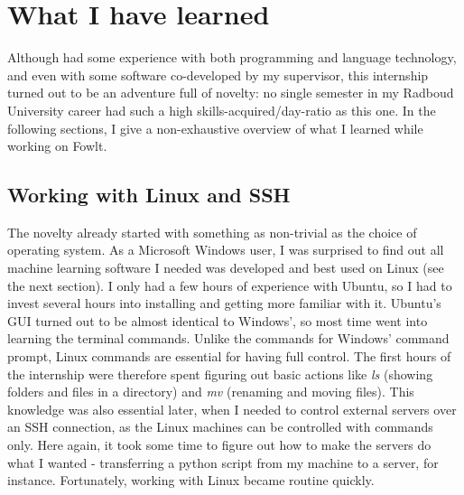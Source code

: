 \documentclass[12pt]{article}
\begin{document}
\section{What I have learned}
Although had some experience with both programming and language technology, and even with some software co-developed by my supervisor, this internship turned out to be an adventure full of novelty: no single semester in my Radboud University career had such a high skills-acquired/day-ratio as this one. In the following sections, I give a non-exhaustive overview of what I learned while working on Fowlt.

\subsection{Working with Linux and SSH}
The novelty already started with something as non-trivial as the choice of operating system. As a Microsoft Windows user, I was surprised to find out all machine learning software I needed was developed and best used on Linux (see the next section). I only had a few hours of experience with Ubuntu, so I had to invest several hours into installing and getting more familiar with it. Ubuntu's GUI turned out to be almost identical to Windows', so most time went into learning the terminal commands. Unlike the commands for Windows' command prompt, Linux commands are essential for having full control. The first hours of the internship were therefore spent figuring out basic actions like \emph{ls} (showing folders and files in a directory) and \emph{mv} (renaming and moving files). This knowledge was also essential later, when I needed to control external servers over an SSH connection, as the Linux machines can be controlled with commands only. Here again, it took some time to figure out how to make the servers do what I wanted - transferring a python script from my machine to a server, for instance. Fortunately, working with Linux became routine quickly.

\end{document}
